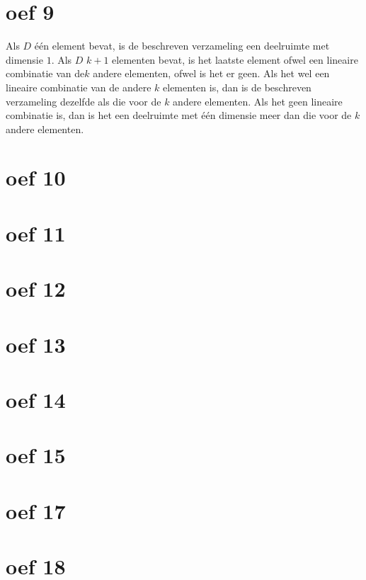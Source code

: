 \documentclass[lineaire_algebra_oplossingen.tex]{subfiles}
\begin{document}
\section{oef 9}
Als $D$ één element bevat, is de beschreven verzameling een deelruimte met dimensie $1$. Als $D$ $k+1$ elementen bevat, is het laatste element ofwel een lineaire combinatie van de$k$ andere elementen, ofwel is het er geen. Als het wel een lineaire combinatie van de andere $k$ elementen is, dan is de beschreven verzameling dezelfde als die voor de $k$ andere elementen. Als het geen lineaire combinatie is, dan is het een deelruimte met één dimensie meer dan die voor de $k$ andere elementen.
\section{oef 10}
\section{oef 11}
\section{oef 12}
\section{oef 13}
\section{oef 14}
\section{oef 15}
\section{oef 17}
\section{oef 18}
\end{document}
